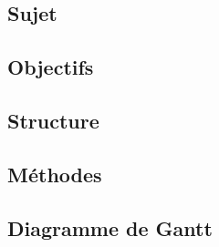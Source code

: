 
\subsection{Sujet}\label{subsec:sujet}

\subsection{Objectifs}\label{subsec:objectifs}

\subsection{Structure}\label{subsec:structure}

\subsection{Méthodes}\label{subsec:methodes}

\subsection{Diagramme de Gantt}\label{subsec:diagramme-de-gantt}






